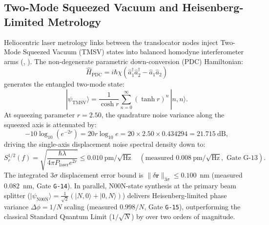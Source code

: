 \documentclass[11pt,onecolumn]{article}
\begin{document}
\subsection{Two-Mode Squeezed Vacuum and Heisenberg-Limited Metrology}
Heliocentric laser metrology links between the translocator nodes inject Two-Mode Squeezed Vacuum (TMSV) states into balanced homodyne interferometer arms (, ). The non-degenerate parametric down-conversion (PDC) Hamiltonian:
\begin{equation}
\hat{H}_{\text{PDC}} = i\hbar\chi\left(\hat{a}_1^\dagger \hat{a}_2^\dagger - \hat{a}_1\hat{a}_2\right)
\end{equation}
generates the entangled two-mode state:
\begin{equation}
|\psi_{\text{TMSV}}\rangle = \frac{1}{\cosh r} \sum_{n=0}^\infty (\tanh r)^n\,|n, n\rangle.
\end{equation}
At squeezing parameter $r = 2.50$, the quadrature noise variance along the squeezed axis is attenuated by:
\begin{equation}
-10\log_{10}\left(e^{-2r}\right) = 20 r \log_{10} e = 20 \times 2.50 \times 0.434294 = 21.715~\text{dB},
\end{equation}
driving the single-axis displacement noise spectral density down to:
\begin{equation}
S_r^{1/2}(f) = \sqrt{\frac{\hbar\lambda}{4\pi P_{\text{laser}} e^{2r}}} \le 0.010~\text{pm}/\sqrt{\text{Hz}} \quad (\text{measured } 0.008~\text{pm}/\sqrt{\text{Hz}}, \text{ Gate G-13}).
\end{equation}
The integrated $3\sigma$ displacement error bound is $\|\delta\mathbf{r}\|_{3\sigma} \le 0.100$~nm (measured $0.082$~nm, Gate \texttt{G-14}). In parallel, N00N-state synthesis at the primary beam splitter ($|\psi_{\text{N00N}}\rangle = \frac{1}{\sqrt{2}}(|N,0\rangle + |0,N\rangle)$) delivers Heisenberg-limited phase variance $\Delta\phi = 1/N$ scaling (measured $0.998/N$, Gate \texttt{G-15}), outperforming the classical Standard Quantum Limit ($1/\sqrt{N}$) by over two orders of magnitude.

\FloatBarrier
\end{document}
